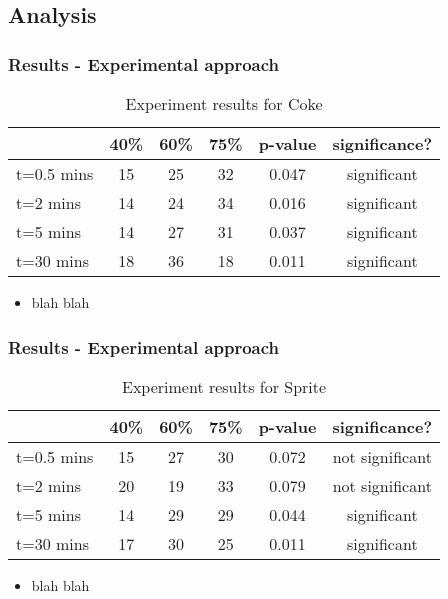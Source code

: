 \documentclass[compress,handout,10pt]{beamer}
\let\olditem\item
\renewcommand{\item}{\setlength{\itemsep}{0.5\baselineskip}\olditem}
\begin{document}
\subsection{Analysis}

\begin{frame}
    \frametitle{Results - Experimental approach}
\begin{table}[ h]
\centering
\begin{tabular}{ l || c|c|c||c|c }
  &40\% &60\% & 75\% &p-value &significance? \\
\hline  
t=0.5 mins & 15 & 25 & 32 & 0.047&significant\\ 
\hline  
t=2 mins & 14 & 24 & 34&0.016&significant\\ 
\hline  
t=5 mins & 14 & 27 & 31&0.037&significant\\ 
\hline  
t=30 mins & 18 & 36 & 18&0.011&significant\\ 
\hline     
 \end{tabular}
\caption{Experiment results for Coke}
\end{table}

\begin{itemize}
\item blah blah
\end{itemize}
\end{frame}


\begin{frame}
    \frametitle{Results - Experimental approach}
\begin{table}[ h]
\centering
\begin{tabular}{ l || c|c|c||c|c }
  &40\% &60\% & 75\% &p-value &significance? \\
\hline  
t=0.5 mins & 15 & 27 & 30&0.072&not significant\\ 
\hline  
t=2 mins & 20 & 19 & 33&0.079&not significant\\ 
\hline  
t=5 mins & 14 & 29 & 29&0.044&significant\\ 
\hline  
t=30 mins & 17 & 30 & 25&0.011&significant\\ 
\hline  
 \end{tabular}
\caption{Experiment results for Sprite}
\end{table}

\begin{itemize}
\item blah blah
\end{itemize}
\end{frame}
\end{document}
